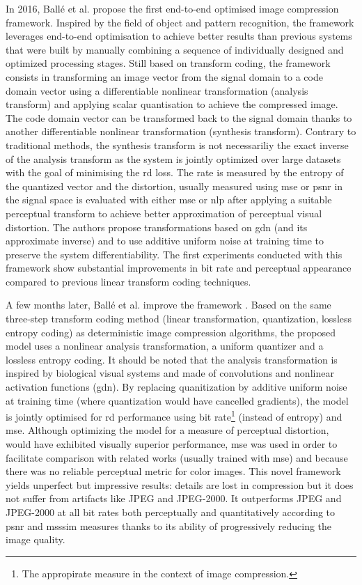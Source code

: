 \documentclass{article}
\begin{document}
In 2016, Ballé et al. \cite{balle2016endtoendoptimizationnonlineartransform} propose the first end-to-end optimised image compression framework. Inspired by the field of object and pattern recognition, the framework leverages end-to-end optimisation to achieve better results than previous systems that were built by manually combining a sequence of individually designed and optimized processing stages. Still based on transform coding, the framework consists in transforming an image vector from the signal domain to a code domain vector using a differentiable nonlinear transformation (analysis transform) and applying scalar quantisation to achieve the compressed image. The code domain vector can be transformed back to the signal domain thanks to another differentiable nonlinear transformation (synthesis transform). Contrary to traditional methods, the synthesis transform is not necessariliy the exact inverse of the analysis transform as the system is jointly optimized over large datasets with the goal of minimising the \acrshort{rd} loss. The rate is measured by the entropy of the quantized vector and the distortion, usually measured using \acrfull{mse} or \acrshort{psnr} in the signal space is evaluated with either \acrshort{mse} or \acrfull{nlp} after applying a suitable perceptual transform to achieve better approximation of perceptual visual distortion. The authors propose transformations based on \acrfull{gdn} (and its approximate inverse) and to use additive uniform noise at training time to preserve the system differentiability. The first experiments conducted with this framework show substantial improvements in bit rate and perceptual appearance compared to previous linear transform coding techniques.

A few months later, Ballé et al. improve the framework \cite{balle2017endtoendoptimizedimagecompression}. Based on the same three-step transform coding method (linear transformation, quantization, lossless entropy coding) as deterministic image compression algorithms, the proposed model uses a nonlinear analysis transformation, a uniform quantizer and a lossless entropy coding. It should be noted that the analysis transformation is inspired by biological visual systems and made of convolutions and nonlinear activation functions (\acrshort{gdn}). By replacing quanitization by additive uniform noise at training time (where quantization would have cancelled gradients), the model is jointly optimised for \acrshort{rd} performance using bit rate\footnote{The appropirate measure in the context of image compression.} (instead of entropy) and \acrshort{mse}. Although optimizing the model for a measure of perceptual distortion, would have exhibited visually superior performance, \acrshort{mse} was used in order to facilitate comparison with related works (usually trained with \acrshort{mse}) and because there was no reliable perceptual metric for color images. This novel framework yields unperfect but impressive results: details are lost in compression but it does not suffer from artifacts like JPEG and JPEG-2000. It outperforms JPEG and JPEG-2000 at all bit rates both perceptually and quantitatively according to \acrshort{psnr} and \acrshort{msssim} measures thanks to its ability of progressively reducing the image quality.
\end{document}
